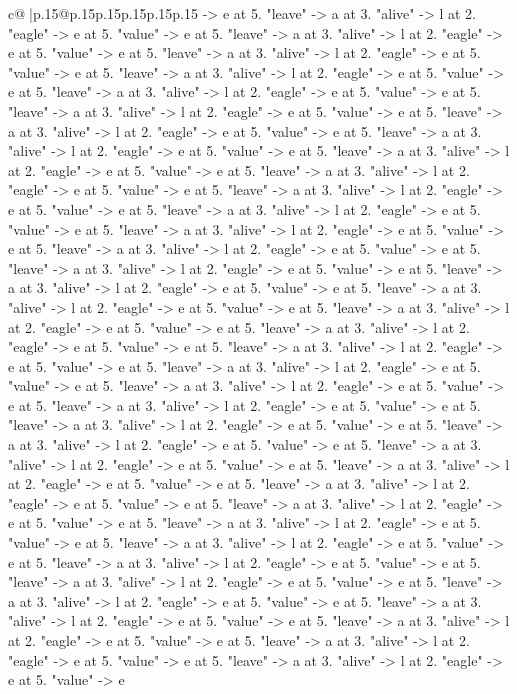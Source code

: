 \documentclass{article}
\begin{document}
{\begin{supertabular}{c@{$\;$}|p{.15\linewidth}@{}p{.15\linewidth}p{.15\linewidth}p{.15\linewidth}p{.15\linewidth}p{.15\linewidth}}
{{{{-}> e at 5. "leave" {-}> a at 3. "alive" {-}> l at 2. "eagle" {-}> e at 5. "value" {-}> e at 5. "leave" {-}> a at 3. "alive" {-}> l at 2. "eagle" {-}> e at 5. "value" {-}> e at 5. "leave" {-}> a at 3. "alive" {-}> l at 2. "eagle" {-}> e at 5. "value" {-}> e at 5. "leave" {-}> a at 3. "alive" {-}> l at 2. "eagle" {-}> e at 5. "value" {-}> e at 5. "leave" {-}> a at 3. "alive" {-}> l at 2. "eagle" {-}> e at 5. "value" {-}> e at 5. "leave" {-}> a at 3. "alive" {-}> l at 2. "eagle" {-}> e at 5. "value" {-}> e at 5. "leave" {-}> a at 3. "alive" {-}> l at 2. "eagle" {-}> e at 5. "value" {-}> e at 5. "leave" {-}> a at 3. "alive" {-}> l at 2. "eagle" {-}> e at 5. "value" {-}> e at 5. "leave" {-}> a at 3. "alive" {-}> l at 2. "eagle" {-}> e at 5. "value" {-}> e at 5. "leave" {-}> a at 3. "alive" {-}> l at 2. "eagle" {-}> e at 5. "value" {-}> e at 5. "leave" {-}> a at 3. "alive" {-}> l at 2. "eagle" {-}> e at 5. "value" {-}> e at 5. "leave" {-}> a at 3. "alive" {-}> l at 2. "eagle" {-}> e at 5. "value" {-}> e at 5. "leave" {-}> a at 3. "alive" {-}> l at 2. "eagle" {-}> e at 5. "value" {-}> e at 5. "leave" {-}> a at 3. "alive" {-}> l at 2. "eagle" {-}> e at 5. "value" {-}> e at 5. "leave" {-}> a at 3. "alive" {-}> l at 2. "eagle" {-}> e at 5. "value" {-}> e at 5. "leave" {-}> a at 3. "alive" {-}> l at 2. "eagle" {-}> e at 5. "value" {-}> e at 5. "leave" {-}> a at 3. "alive" {-}> l at 2. "eagle" {-}> e at 5. "value" {-}> e at 5. "leave" {-}> a at 3. "alive" {-}> l at 2. "eagle" {-}> e at 5. "value" {-}> e at 5. "leave" {-}> a at 3. "alive" {-}> l at 2. "eagle" {-}> e at 5. "value" {-}> e at 5. "leave" {-}> a at 3. "alive" {-}> l at 2. "eagle" {-}> e at 5. "value" {-}> e at 5. "leave" {-}> a at 3. "alive" {-}> l at 2. "eagle" {-}> e at 5. "value" {-}> e at 5. "leave" {-}> a at 3. "alive" {-}> l at 2. "eagle" {-}> e at 5. "value" {-}> e at 5. "leave" {-}> a at 3. "alive" {-}> l at 2. "eagle" {-}> e at 5. "value" {-}> e at 5. "leave" {-}> a at 3. "alive" {-}> l at 2. "eagle" {-}> e at 5. "value" {-}> e at 5. "leave" {-}> a at 3. "alive" {-}> l at 2. "eagle" {-}> e at 5. "value" {-}> e at 5. "leave" {-}> a at 3. "alive" {-}> l at 2. "eagle" {-}> e at 5. "value" {-}> e at 5. "leave" {-}> a at 3. "alive" {-}> l at 2. "eagle" {-}> e at 5. "value" {-}> e at 5. "leave" {-}> a at 3. "alive" {-}> l at 2. "eagle" {-}> e at 5. "value" {-}> e at 5. "leave" {-}> a at 3. "alive" {-}> l at 2. "eagle" {-}> e at 5. "value" {-}> e at 5. "leave" {-}> a at 3. "alive" {-}> l at 2. "eagle" {-}> e at 5. "value" {-}> e at 5. "leave" {-}> a at 3. "alive" {-}> l at 2. "eagle" {-}> e at 5. "value" {-}> e at 5. "leave" {-}> a at 3. "alive" {-}> l at 2. "eagle" {-}> e at 5. "value" {-}> e at 5. "leave" {-}> a at 3. "alive" {-}> l at 2. "eagle" {-}> e at 5. "value" {-}> e at 5. "leave" {-}> a at 3. "alive" {-}> l at 2. "eagle" {-}> e at 5. "value" {-}> e at 5. "leave" {-}> a at 3. "alive" {-}> l at 2. "eagle" {-}> e at 5. "value" {-}> e at 5. "leave" {-}> a at 3. "alive" {-}> l at 2. "eagle" {-}> e at 5. "value" {-}> e at 5. "leave" {-}> a at 3. "alive" {-}> l at 2. "eagle" {-}> e at 5. "value" {-}> e at 5. "leave" {-}> a at 3. "alive" {-}> l at 2. "eagle" {-}> e at 5. "value" {-}> e }}}
\end{supertabular}}
\end{document}
